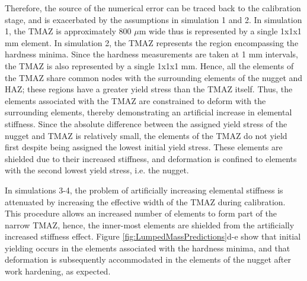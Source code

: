 Therefore, the source of the numerical error can be traced back to the calibration stage, and is exacerbated by the assumptions in simulation 1 and 2. In simulation 1, the TMAZ is approximately 800 $\mu$m wide thus is represented by a single 1x1x1 mm element. In simulation 2, the TMAZ represents the region encompassing the hardness minima. Since the hardness measurements are taken at 1 mm intervals, the TMAZ is also represented by a single 1x1x1 mm. Hence, all the elements of the TMAZ share common nodes with the surrounding elements of the nugget and HAZ; these regions have a greater yield stress than the TMAZ itself. Thus, the elements associated with the TMAZ are constrained to deform with the surrounding elements, thereby demonstrating an artificial increase in elemental stiffness. Since the absolute difference between the assigned yield stress of the nugget and TMAZ is relatively small, the elements of the TMAZ do not yield first despite being assigned the lowest initial yield stress. These elements are shielded due to their increased stiffness, and deformation is confined to elements with the second lowest yield stress, i.e. the nugget. %

In simulations 3-4, the problem of artificially increasing elemental stiffness is attenuated by increasing the effective width of the TMAZ during calibration. This procedure allows an increased number of elements to form part of the narrow TMAZ, hence, the inner-most elements are shielded from the artificially increased stiffness effect. Figure \ref{fig:LumpedMassPredictions}d-e show that initial yielding occurs in the elements associated with the hardness minima, and that deformation is subsequently accommodated in the elements of the nugget after work hardening, as expected. 

